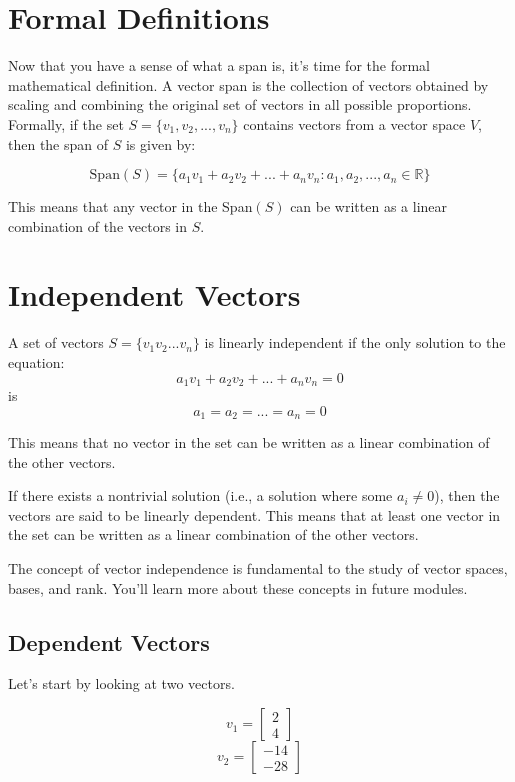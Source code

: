 \section{Formal Definitions}
Now that you have a sense of what a span is, it's time for the formal mathematical definition. A vector span is the collection of vectors obtained by scaling and combining the original set of vectors in all possible proportions.  Formally, if the set $S = \{v_1, v_2, ..., v_n\}$ contains vectors from a vector space $V$, then the span of $S$ is given by:

\begin{equation}
\text{Span}(S) = \{a_1v_1 + a_2v_2 + ... + a_nv_n : a_1, a_2, ..., a_n \in \mathbb{R}\}
\end{equation}

This means that any vector in the Span$(S)$ can be written as a linear combination of the vectors in $S$.

\section{Independent Vectors}
A set of vectors $S = \{v_1 v_2 ... v_n\}$ is  linearly independent if the only solution to the equation:
$$a_1v_1 + a_2v_2 + ... + a_nv_n = 0$$
is 
$$a_1 = a_2 = ... = a_n = 0$$ 

This means that no vector in the set can be written as a linear combination of the other vectors.

If there exists a nontrivial solution (i.e., a solution where some $a_i \neq 0$), then the vectors are said to be linearly dependent. This means that at least one vector in the set can be written as a linear combination of the other vectors.

The concept of vector independence is fundamental to the study of vector spaces, bases, and rank. You'll learn more about these concepts in future modules. 

\subsection{Dependent Vectors}
Let's start by looking at two vectors. 

$$v_1 = \begin{bmatrix}
			2 \\
			4
		\end{bmatrix}$$
$$v_2 = \begin{bmatrix}
			-14 \\
			-28
\end{bmatrix}$$

